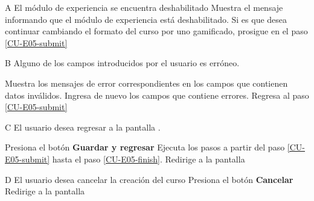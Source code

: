 \begin{UCtrayectoriaA}{A}{%
El módulo de experiencia se encuentra deshabilitado
}
  \Sistema Muestra el mensaje informando que el módulo de experiencia está deshabilitado.
  \Actor Si es que desea continuar cambiando el formato del curso por uno gamificado,
         prosigue en el paso \ref{CU-E05-submit}

\end{UCtrayectoriaA}

\begin{UCtrayectoriaA}{B}{%
Alguno de los campos introducidos por el usuario es erróneo.
}

  \Sistema Muestra los mensajes de error correspondientes en los campos que
           contienen datos inválidos.
  \Actor Ingresa de nuevo los campos que contiene errores.
  \Sistema Regresa al paso \ref{CU-E05-submit}

\end{UCtrayectoriaA}

\begin{UCtrayectoriaA}{C}{%
El usuario desea regresar a la pantalla .
}

  \Actor Presiona el botón {\bf Guardar y regresar}
  \Sistema Ejecuta los pasos a partir del paso \ref{CU-E05-submit} hasta el
           paso \ref{CU-E05-finish}.
  \Sistema Redirige a la pantalla 

\end{UCtrayectoriaA}

\begin{UCtrayectoriaA}{D}{%
El usuario desea cancelar la creación del curso
}
  \Actor Presiona el botón {\bf Cancelar}
  \Sistema Redirige a la pantalla 

\end{UCtrayectoriaA}
